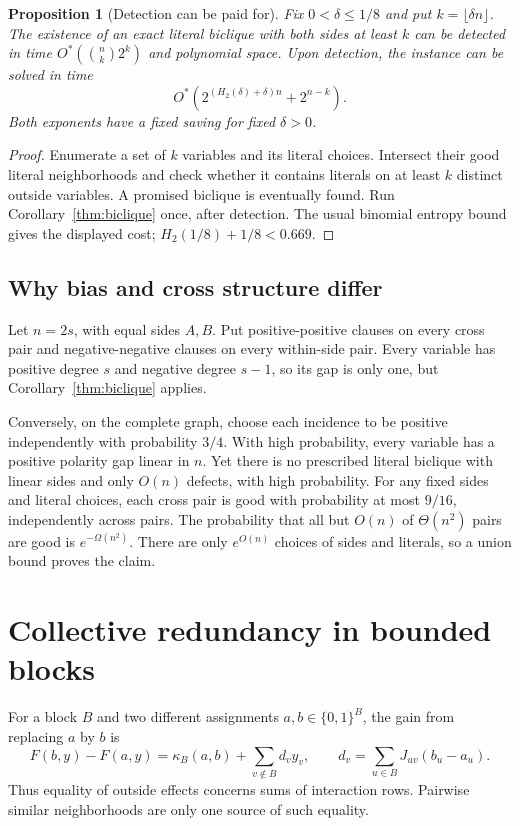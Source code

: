 \documentclass[11pt,a4paper]{article}
\newtheorem{proposition}[theorem]{Proposition}
\theoremstyle{definition}
\theoremstyle{remark}
\newcommand{\Ostar}{O^{*}}
\newcommand{\bits}{\{0,1\}}
\begin{document}
\begin{proposition}[Detection can be paid for]\label{prop:detect}
Fix $0<\delta\le1/8$ and put $k=\lfloor\delta n\rfloor$. The existence of
an exact literal biclique with both sides at least $k$ can be detected in
time $\Ostar(\binom nk2^k)$ and polynomial space. Upon detection, the
instance can be solved in time
\[
 \Ostar\left(2^{(H_2(\delta)+\delta)n}+2^{n-k}\right).
\]
Both exponents have a fixed saving for fixed $\delta>0$.
\end{proposition}
\begin{proof}
Enumerate a set of $k$ variables and its literal choices. Intersect their
good literal neighborhoods and check whether it contains literals on at
least $k$ distinct outside variables. A promised biclique is eventually
found. Run Corollary~\ref{thm:biclique} once, after detection. The usual binomial
entropy bound gives the displayed cost; $H_2(1/8)+1/8<0.669$.
\end{proof}

\subsection{Why bias and cross structure differ}\label{sec:separation}

Let $n=2s$, with equal sides $A,B$. Put positive-positive clauses on every
cross pair and negative-negative clauses on every within-side pair. Every
variable has positive degree $s$ and negative degree $s-1$, so its gap is
only one, but Corollary~\ref{thm:biclique} applies.

Conversely, on the complete graph, choose each incidence to be positive
independently with probability $3/4$. With high probability, every variable
has a positive polarity gap linear in $n$. Yet there is no prescribed
literal biclique with linear sides and only $O(n)$ defects, with high
probability. For any fixed sides and literal choices, each cross pair is
good with probability at most $9/16$, independently across pairs. The
probability that all but $O(n)$ of $\Theta(n^2)$ pairs are good is
$e^{-\Omega(n^2)}$. There are only $e^{O(n)}$ choices of sides and literals,
so a union bound proves the claim.

\section{Collective redundancy in bounded blocks}\label{sec:blocks}

For a block $B$ and two different assignments $a,b\in\bits^B$, the gain
from replacing $a$ by $b$ is
\begin{equation}
 F(b,y)-F(a,y)=\kappa_B(a,b)+\sum_{v\notin B}d_vy_v,
 \qquad d_v=\sum_{u\in B}J_{uv}(b_u-a_u).       \label{eq:blockgain}
\end{equation}
Thus equality of outside effects concerns sums of interaction rows.
Pairwise similar neighborhoods are only one source of such equality.
\end{document}
